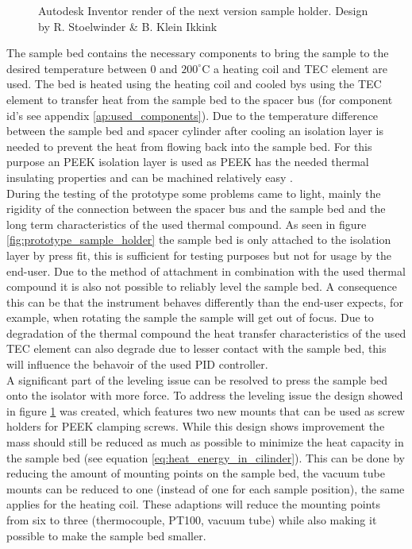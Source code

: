 \documentclass[10pt]{article}
\begin{document}
\begin{figure}[H]
\begin{minipage}[b]{0.45\textwidth}
    \caption{Autodesk Inventor render of the next version sample holder. Design by R. Stoelwinder \& B. Klein Ikkink}
    \label{fig:next_sample_holder}
  \end{minipage}
\end{figure}

The sample bed contains the necessary components to bring the sample to the desired temperature between $0$ and $200^\circ$C a heating coil and TEC element are used. 
The bed is heated using the heating coil and cooled bys using the TEC element to transfer heat from the sample bed to the spacer bus (for component id's see appendix \ref{ap:used_components}).
Due to the temperature difference between the sample bed and spacer cylinder after cooling an isolation layer is needed to prevent the heat from flowing back into the sample bed.
For this purpose an PEEK isolation layer is used as PEEK has the needed thermal insulating properties and can be machined relatively easy \cite{lingPolyetherEtherKetone2020}.\\

During the testing of the prototype some problems came to light, mainly the rigidity of the connection between the spacer bus and the sample bed and the long term characteristics of the used thermal compound.
As seen in figure \ref{fig:prototype_sample_holder} the sample bed is only attached to the isolation layer by press fit, this is sufficient for testing purposes but not for usage by the end-user.
Due to the method of attachment in combination with the used thermal compound it is also not possible to reliably level the sample bed.
A consequence this can be that the instrument behaves differently than the end-user expects, for example, when rotating the sample the sample will get out of focus.
Due to degradation of the thermal compound the heat transfer characteristics of the used TEC element can also degrade due to lesser contact with the sample bed, this will influence the behavoir of the used PID controller.\\

A significant part of the leveling issue can be resolved to press the sample bed onto the isolator with more force.
To address the leveling issue the design showed in figure \ref{fig:next_sample_holder} was created, which features two new mounts that can be used as screw holders for PEEK clamping screws.
While this design shows improvement the mass should still be reduced as much as possible to minimize the heat capacity in the sample bed (see equation \ref{eq:heat_energy_in_cilinder}).
This can be done by reducing the amount of mounting points on the sample bed, the vacuum tube mounts can be reduced to one (instead of one for each sample position), the same applies for the heating coil.
These adaptions will reduce the mounting points from six to three (thermocouple, PT100, vacuum tube) while also making it possible to make the sample bed smaller.
\end{document}
